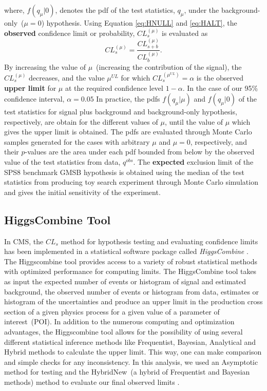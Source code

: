 where, $f(q_{\mu}|0)$, denotes the pdf of the test statistics, $q_{\mu}$, under the background-only~($\mu = 0$) hypothesis.
Using Equation \ref{eq:HNULL} and \ref{eq:HALT}, the \textbf{observed} confidence limit or probability, $ CL^{(\mu)}_{s} $ is evaluated as
\begin{equation}
CL^{(\mu)}_{s} = \frac{CL^{(\mu)}_{s+b} }{ CL^{(\mu)}_{b}}.
\end{equation}
By increasing the value of $\mu$~(increasing the contribution of the signal), the $CL^{(\mu)}_{s}$ decreases, and the value $\mu^{UL}$ for which $CL^{(\mu^{UL})}_{s} = \alpha$ is the observed \textbf{upper limit} for $\mu$ at the required confidence level $1 - \alpha$. In the case of our 95\% confidence interval, $\alpha = 0.05$
\newline
In practice, the pdfs $f(q_{\mu}|\mu)$ and $f(q_{\mu}|0)$ of the test statistics for signal plus background and  background-only hypothesis, respectively, are obtain for the different values of $\mu$, until the value of $\mu$ which gives the upper limit is obtained. The pdfs are evaluated through Monte Carlo samples generated for the cases with arbitrary $\mu $ and $\mu = 0$, respectively, and their $p$-values are the area under each pdf bounded from below by the observed value of the test statistics from data, $q^{obs}$.
\newline
The \textbf{expected} exclusion limit of the SPS8 benchmark GMSB hypothesis is obtained using the median of the test statistics from producing toy search experiment through Monte Carlo simulation and gives the initial sensitivity of the experiment.  
\subsection{HiggsCombine Tool}
In CMS, the $CL_{s}$ method for hypothesis testing and evaluating confidence limits has been implemented in a statistical software package called \textit{HiggsCombine} \cite{LIMITS}. The Higgscombine tool provides access to a variety of robust statistical methods with optimized performance for computing limits. The HiggsCombine tool takes as input the expected number of events or histogram of signal and estimated  background, the observed number of events or histogram from data, estimates or histogram of the uncertainties and produce an upper limit in the production cross section of a given physics process for a given value of a parameter of interest~(POI). In addition to the numerous computing and optimization advantages, the Higgscombine tool allows for the possibility of using several different statistical inference methods like Frequentist, Bayesian, Analytical and Hybrid methods to calculate the upper limit. This way, one can make comparison and simple checks for any inconsistency. In this analysis, we used an Asymptotic method for testing and the HybridNew~(a hybrid of Frequentist and Bayesian methods) method  to evaluate our final observed  limits \cite{LIMITS,ASYMP}. 

